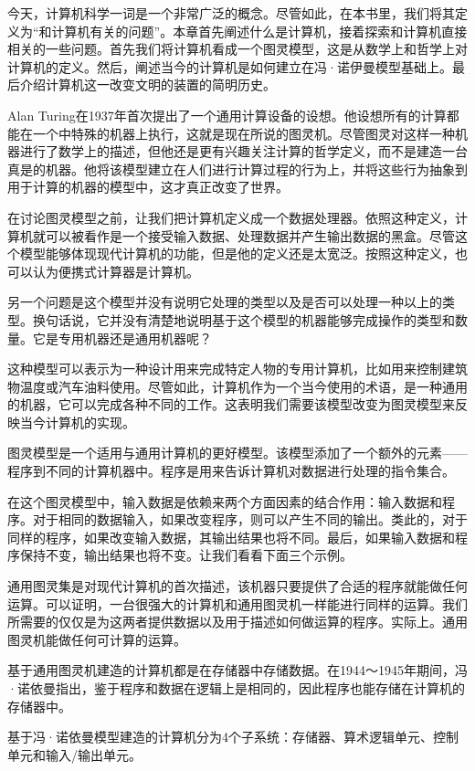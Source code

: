 
今天，计算机科学一词是一个非常广泛的概念。尽管如此，在本书里，我们将其定义为“和计算机有关的问题”。本章首先阐述什么是计算机，接着探索和计算机直接相关的一些问题。首先我们将计算机看成一个图灵模型，这是从数学上和哲学上对计算机的定义。然后，阐述当今的计算机是如何建立在冯·诺伊曼模型基础上。最后介绍计算机这一改变文明的装置的简明历史。

Alan Turing在1937年首次提出了一个通用计算设备的设想。他设想所有的计算都能在一个中特殊的机器上执行，这就是现在所说的图灵机。尽管图灵对这样一种机器进行了数学上的描述，但他还是更有兴趣关注计算的哲学定义，而不是建造一台真是的机器。他将该模型建立在人们进行计算过程的行为上，并将这些行为抽象到用于计算的机器的模型中，这才真正改变了世界。

在讨论图灵模型之前，让我们把计算机定义成一个数据处理器。依照这种定义，计算机就可以被看作是一个接受输入数据、处理数据并产生输出数据的黑盒。尽管这个模型能够体现现代计算机的功能，但是他的定义还是太宽泛。按照这种定义，也可以认为便携式计算器是计算机。

另一个问题是这个模型并没有说明它处理的类型以及是否可以处理一种以上的类型。换句话说，它并没有清楚地说明基于这个模型的机器能够完成操作的类型和数量。它是专用机器还是通用机器呢？


这种模型可以表示为一种设计用来完成特定人物的专用计算机，比如用来控制建筑物温度或汽车油料使用。尽管如此，计算机作为一个当今使用的术语，是一种通用的机器，它可以完成各种不同的工作。这表明我们需要该模型改变为图灵模型来反映当今计算机的实现。

图灵模型是一个适用与通用计算机的更好模型。该模型添加了一个额外的元素——程序到不同的计算机器中。程序是用来告诉计算机对数据进行处理的指令集合。

在这个图灵模型中，输入数据是依赖来两个方面因素的结合作用：输入数据和程序。对于相同的数据输入，如果改变程序，则可以产生不同的输出。类此的，对于同样的程序，如果改变输入数据，其输出结果也将不同。最后，如果输入数据和程序保持不变，输出结果也将不变。让我们看看下面三个示例。

通用图灵集是对现代计算机的首次描述，该机器只要提供了合适的程序就能做任何运算。可以证明，一台很强大的计算机和通用图灵机一样能进行同样的运算。我们所需要的仅仅是为这两者提供数据以及用于描述如何做运算的程序。实际上。通用图灵机能做任何可计算的运算。

基于通用图灵机建造的计算机都是在存储器中存储数据。在1944～1945年期间，冯·诺依曼指出，鉴于程序和数据在逻辑上是相同的，因此程序也能存储在计算机的存储器中。

基于冯·诺依曼模型建造的计算机分为4个子系统：存储器、算术逻辑单元、控制单元和输入/输出单元。

